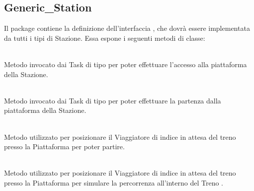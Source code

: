 \subsection{Generic\_Station}
	
	Il package  contiene la definizione dell'interfaccia , che dovrà essere implementata da tutti i tipi di Stazione. Essa espone i seguenti metodi di classe:
	\begin{description}
		\item {} \\
		Metodo invocato dai Task di tipo  per poter effettuare l'accesso alla piattaforma  della Stazione.
		
		\item {} \\
		Metodo invocato dai Task di tipo  per poter effettuare la partenza dalla piattaforma  della Stazione.
		
		\item {} \\
		Metodo utilizzato per posizionare il Viaggiatore di indice  in attesa del treno  presso la Piattaforma  per poter partire.		
			
		\item {} \\
		Metodo utilizzato per posizionare il Viaggiatore di indice  in attesa del treno  presso la Piattaforma  per simulare la percorrenza all'interno del Treno .
			

\end{description}
